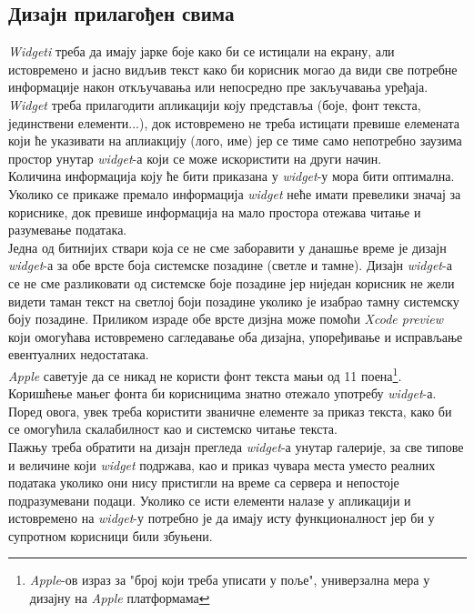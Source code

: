 \documentclass[12pt,oneside]{memoir}
\begin{document}
\subsection{Дизајн прилагођен свима}
\indent \textit{Widgeti} треба да имају јарке боје како би се истицали на екрану, али истовремено и јасно видљив текст како би корисник могао да види све потребне информације након откључавања или непосредно пре закључавања уређаја. \textit{Widget} треба прилагодити апликацији коју представља (боје, фонт текста, јединствени елементи...), док истовремено не треба истицати превише елемената који ће указивати на аплиакцију (лого, име) јер се тиме само непотребно заузима простор унутар \textit{widget}-а који се може искористити на други начин.  
\\
\indent Количина информација коју ће бити приказана у \textit{widget}-у мора бити оптимална. Уколико се прикаже премало информација \textit{widget} неће имати превелики значај за кориснике, док превише информација на мало простора отежава читање и разумевање података.
\\
\indent Једна од битнијих ствари која се не сме заборавити у данашње време је дизајн \textit{widget}-а за обе врсте боја системске позадине (светле и тамне). Дизајн \textit{widget}-а се не сме разликовати од системске боје позадине јер ниједан корисник не жели видети таман текст на светлој боји позадине уколико је изабрао тамну системску боју позадине. Приликом израде обе врсте дизјна може помоћи \textit{Xcode preview} који омогућава истовремено сагледавање оба дизајна, упоређивање и исправљање евентуалних недостатака.
\\
\indent \textit{Apple} саветује да се никад не користи фонт текста мањи од 11 поена\footnote{\textit{Apple}-ов израз за "број који треба уписати у поље", универзална мера у дизајну на \textit{Apple} платформама}. Коришћење мањег фонта би корисницима знатно отежало употребу \textit{widget}-а. Поред овога, увек треба користити званичне елементе за приказ текста, како би се омогућила скалабилност као и системско читање текста. 
\\
\indent Пажњу треба обратити на дизајн прегледа \textit{widget}-а унутар галерије, за све типове и величине који \textit{widget} подржава, као и приказ чувара места уместо реалних података уколико они нису пристигли на време са сервера и непостоје подразумевани подаци. Уколико се исти елементи налазе у апликацији и истовремено на \textit{widget}-у потребно је да имају исту функционалност јер би у супротном корисници били збуњени. 
\\
\end{document}
